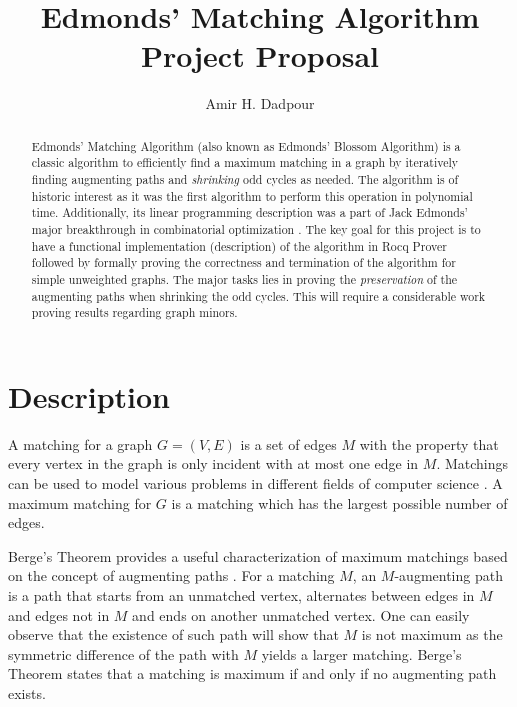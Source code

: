 \documentclass[acmsmall, screen, nonacm]{acmart}
\begin{document}
\title{Edmonds' Matching Algorithm Project Proposal}
\author{Amir H. Dadpour}


\begin{abstract}
	Edmonds' Matching Algorithm (also known as Edmonds' Blossom Algorithm) \cite{Edmonds1965} is a classic algorithm to efficiently find a maximum matching in a graph by iteratively finding augmenting paths and \textit{shrinking} odd cycles as needed. The algorithm is of historic interest as it was the first algorithm to perform this operation in polynomial time. Additionally, its linear programming description was a part of Jack Edmonds' major breakthrough in combinatorial optimization \cite{Edmonds1965MA}.
	The key goal for this project is to have a functional implementation (description) of the algorithm in Rocq Prover followed by formally proving the correctness and termination of the algorithm for simple unweighted graphs. The major tasks lies in proving the \textit{preservation} of the augmenting paths when shrinking the odd cycles. This will require a considerable work proving results regarding graph minors.
\end{abstract}


\maketitle

\section{Description}

A matching for a graph $G=(V,E)$ is a set of edges $M$ with the property that every vertex in the graph is only incident with at most one edge in $M$. Matchings can be used to model various problems in different fields of computer science \cite{Bunke2000}. A maximum matching for $G$ is a matching which has the largest possible number of edges. 

Berge's Theorem provides a useful characterization of maximum matchings based on the concept of augmenting paths \cite{Berge1957}. For a matching $M$, an $M$-augmenting path is a path that starts from an unmatched vertex, alternates between edges in $M$ and edges not in $M$ and ends on another unmatched vertex. One can easily observe that the existence of such path will show that $M$ is not maximum as the symmetric difference of the path with $M$ yields a larger matching. Berge's Theorem states that a matching is maximum if and only if no augmenting path exists.
\end{document}
